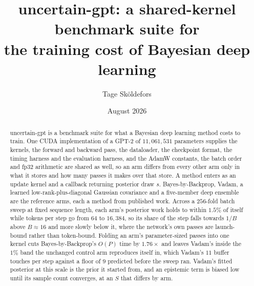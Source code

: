\documentclass[11pt]{article}
\title{uncertain-gpt: a shared-kernel benchmark suite for\\the training cost of Bayesian deep learning}
\author{Tage Sköldefors}
\date{August 2026}
\begin{document}
\maketitle

\begin{abstract}
uncertain-gpt is a benchmark suite for what a Bayesian deep learning method costs to
train. One CUDA implementation of a GPT-2 of $11{,}061{,}531$ parameters supplies the
kernels, the forward and backward pass, the dataloader, the checkpoint format, the
timing harness and the evaluation harness, and the AdamW constants, the batch order
and fp32 arithmetic are shared as well, so an arm differs from every other arm only in
what it stores and how many passes it makes over that store. A method enters as an
update kernel and a callback returning posterior draw $s$. Bayes-by-Backprop, Vadam, a
learned low-rank-plus-diagonal Gaussian covariance and a five-member deep ensemble are
the reference arms, each a method from published work. Across a $256$-fold batch sweep
at fixed sequence length, each arm's posterior work holds to within $1.5\%$ of itself
while tokens per step go from $64$ to $16{,}384$, so its share of the step falls
towards $1/B$ above $B \approx 16$ and more slowly below it, where the network's own
passes are launch-bound rather than token-bound. Folding an arm's parameter-sized
passes into one kernel cuts Bayes-by-Backprop's $O(P)$ time by $1.76\times$ and leaves
Vadam's inside the $1\%$ band the unchanged control arm reproduces itself in, which
Vadam's $11$ buffer touches per step against a floor of $9$ predicted before the sweep
ran. Vadam's fitted posterior at this scale is the prior it started from, and an
epistemic term is biased low until its sample count converges, at an $S$ that differs
by arm.
\end{abstract}












\end{document}
